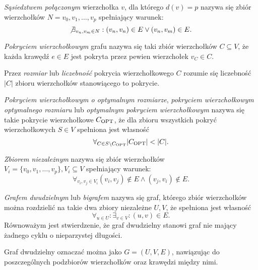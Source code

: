 \begin{definition}
  \emph{Sąsiedztwem połączonym} wierzchołka $v$, dla którego $d(v)=p$ nazywa się zbiór wierzchołków 
  $N={v_0, v_1, \ldots, v_p}$ spełniający warunek:\[
  \not \exists_{v_n, v_m \in N}:{(v_n,v_n) \in E \lor (v_n,v_m) \in E}.
  \]
\end{definition}

\begin{definition}
  \emph{Pokryciem wierzchołkowym} grafu nazywa się taki zbiór wierzchołków
  $C \subseteq V$, że każda krawędź $e \in E$ jest pokryta przez pewien wierzchołek $ v_C \in C$.
\end{definition}

\begin{definition}
  Przez \emph{rozmiar} lub \emph{liczebność} pokrycia wierzchołkowego $C$ rozumie się liczebność $|C|$ zbioru wierzchołków stanowiącego to pokrycie.
\end{definition}

\begin{definition}
  \emph{Pokryciem wierzchołkowym o optymalnym rozmiarze}, \emph{pokryciem wierzchołkowym optymalnego rozmiaru} lub \emph{optymalnym pokryciem wierzchołkowym} 
  nazywa się takie pokrycie wierzchołkowe $C_{\textnormal{OPT}}$, że dla zbioru wszystkich pokryć wierzchołkowych $S \in V$ spełniona jest własność \[\forall_{C \in S \setminus C_{\textnormal{OPT}}}{|C_{\textnormal{OPT}}| < |C|}.\]
\end{definition}

\begin{definition}
  \emph{Zbiorem niezależnym} nazywa się zbiór wierzchołków\\
  $V_i=\{v_0, v_1, \ldots, v_p \}, V_i \subseteq V$ spełniający warunek:
  \[\forall_{v_i, v_j \in V_i}{(v_i, v_j) \notin E \land (v_j, v_i) \notin E}.\]
\end{definition}

\begin{definition}
  \emph{Grafem dwudzielnym} lub \emph{bigrafem} nazywa się graf, którego zbiór wierzchołków można rozdzielić na takie dwa zbiory niezależne $U, V$, że spełniona jest własność \[\forall_{u \in U}: \exists_{v \in V}: (u,v) \in E.\]
  Równoważym jest stwierdzenie, że graf dwudzielny stanowi graf nie mający
  żadnego cyklu o nieparzystej długości.

  Graf dwudzielny oznaczać można jako $G=(U,V,E)$, nawiązując do poszczególnych
  podzbiorów wierzchołków oraz krawędzi między nimi.
\end{definition}

